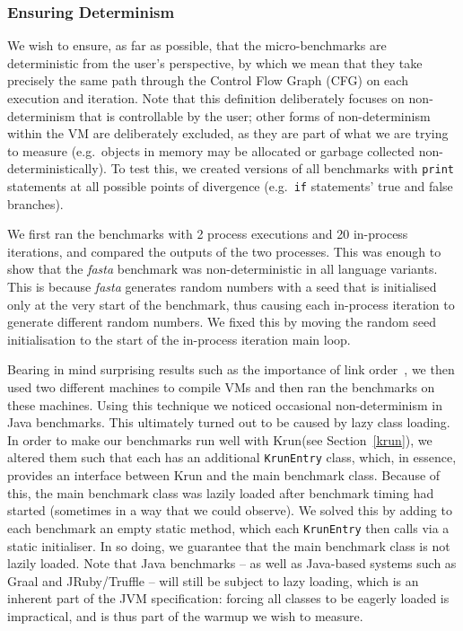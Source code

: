 \documentclass[a4paper,UKenglish]{lipics}
\newcommand{\krun}{Krun\xspace}
\newcommand{\fasta}{\emph{fasta}\xspace}
\begin{document}
\subsubsection{Ensuring Determinism}

We wish to ensure, as far as possible, that the micro-benchmarks are
deterministic from the user's perspective, by which we mean that they
take precisely the same path through the Control Flow Graph (CFG) on each
execution and iteration. Note that this definition deliberately focuses
on non-determinism that is controllable by the user; other forms of
non-determinism within the VM are deliberately excluded, as they are
part of what we are trying to measure (e.g.~objects in memory may be allocated
or garbage collected non-deterministically). To test this, we created
versions of all benchmarks with \texttt{print} statements at all possible points of
divergence (e.g.~\texttt{if} statements' true and false branches).

We first ran the benchmarks with 2 process executions and 20 in-process iterations,
and compared the outputs of the two processes. This was enough to show that the
\fasta benchmark was non-deterministic
in all language variants. This is because \fasta generates random numbers with
a seed that is initialised only at the very start of the benchmark, thus
causing each in-process iteration to generate different random numbers. We
fixed this by moving the random seed initialisation to the start
of the in-process iteration main loop.

Bearing in mind surprising
results such as the importance of link order~\cite{mytkowicz09surprising}, we
then used two different machines to compile VMs and then ran the benchmarks
on these machines.
Using this technique we noticed occasional non-determinism in Java benchmarks.
This ultimately turned out to be caused by lazy class loading. In order
to make our benchmarks run well with \krun (see Section~\ref{krun}), we
altered them such that each has an additional \texttt{KrunEntry} class,
which, in essence, provides an interface between \krun and the main benchmark
class. Because of this, the main benchmark class was lazily loaded after
benchmark timing had started (sometimes in a way that we could observe). We
solved this by adding to each benchmark an empty static method, which each
\texttt{KrunEntry} then calls via a static initialiser. In so doing, we
guarantee that the main benchmark class is not lazily loaded. Note that Java
benchmarks -- as well as
Java-based systems such as Graal and JRuby/Truffle -- will still be subject to
lazy loading, which is an inherent part of the JVM specification: forcing all
classes to be eagerly loaded is impractical, and is thus part of the warmup we
wish to measure.
\end{document}
